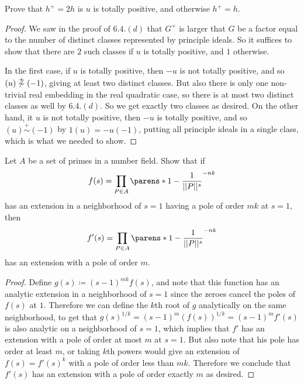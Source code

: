 \documentclass[11pt]{article}
\begin{document}
Prove that $h^+ = 2h$ is $u$ is totally positive, and otherwise $h^+ = h$.
\begin{proof}
  We saw in the proof of $6.4.(d)$ that $G^+$ is larger that $G$ be a factor equal to the number of distinct classes represented by principle ideals.
  So it suffices to show that there are $2$ such classes if $u$ is totally positive, and $1$ otherwise.

  In the first case, if $u$ is totally positive, then $-u$ is not totally positive, and so $(u) \not \overset{+}{\sim} (-1)$, giving at least two distinct classes.
  But also there is only one non-trivial real embedding in the real quadratic case, so there is at most two distinct classes as well by $6.4.(d)$.
  So we get exactly two classes as desired.
  On the other hand, it $u$ is not totally positive, then $-u$ is totally positive, and so $(u) \overset{+}{\sim} (-1)$ by $1(u) = -u(-1)$, putting all principle ideals in a single class, which is what we needed to show.
\end{proof}


Let $A$ be a set of primes in a number field.
Show that if $$f(s) = \prod_{P \in A} \parens*{1 - \frac{1}{||P||^s}}^{-nk}$$ has an extension in a neighborhood of $s = 1$ having a pole of order $mk$ at $s = 1$, then $$f'(s) = \prod_{P \in A} \parens*{1 - \frac{1}{||P||^s}}^{-nk}$$ has an extension with a pole of order $m$.
\begin{proof}
  Define $g(s) \coloneqq (s-1)^{mk}f(s)$, and note that this function has an analytic extension in a neighborhood of $s = 1$ since the zeroes cancel the poles of $f(s)$ at $1$.
  Therefore we can define the $k$th root of $g$ analytically on the same neighborhood, to get that $g(s)^{1/k} = (s-1)^m(f(s))^{1/k} = (s-1)^m f'(s)$ is also analytic on a neighborhood of $s = 1$, which implies that $f'$ has an extension with a pole of order at most $m$ at $s = 1$.
  But also note that his pole has order at least $m$, or taking $k$th powers would give an extension of $f(s) = f'(s)^k$ with a pole of order less than $mk$.
  Therefore we conclude that $f'(s)$ has an extension with a pole of order exactly $m$ as desired.
\end{proof}
\end{document}
